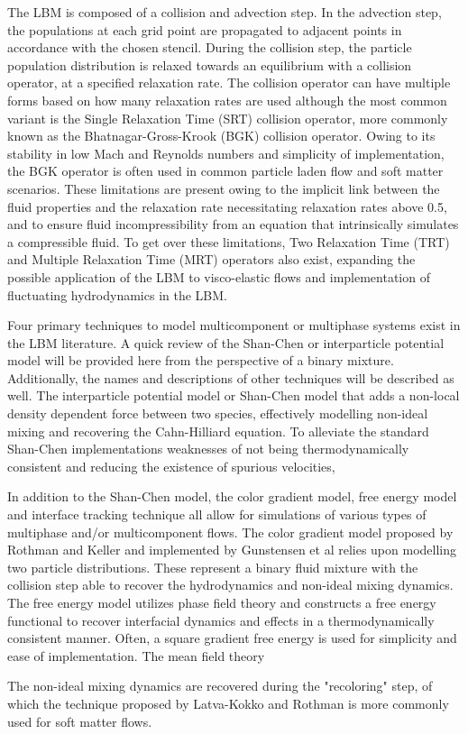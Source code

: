 The LBM is composed of a collision and advection step. In the advection step, the populations at each grid point are propagated to adjacent points in accordance 
with the chosen stencil. During the collision step, the particle population distribution is relaxed towards an equilibrium with a collision operator, at a 
specified relaxation rate. The collision operator can have multiple forms based on how many relaxation rates are used although the most common variant is the 
Single Relaxation Time (SRT) collision operator, more commonly known as the Bhatnagar-Gross-Krook (BGK) collision operator. Owing to its stability in low Mach 
and Reynolds numbers and simplicity of implementation, the BGK operator is often used in common particle laden flow and soft matter scenarios. 
\cite{bhatnagar_model_1954} These limitations are present owing to the implicit link between the fluid properties and the relaxation rate necessitating 
relaxation rates above 0.5, and to ensure fluid incompressibility from an equation that intrinsically simulates a compressible fluid. To get over these 
limitations, Two Relaxation Time (TRT) and Multiple Relaxation Time (MRT) operators also exist, expanding the possible application of the LBM to visco-elastic 
flows and implementation of fluctuating hydrodynamics in the LBM. \cite{liu_simulation_2023, adhikari_fluctuating_2005}

Four primary techniques to model multicomponent or multiphase systems exist in the LBM literature. A quick review of the Shan-Chen or 
interparticle potential model  will be provided here from the perspective of a binary mixture. Additionally, the names and descriptions of 
other techniques will be described as well. The interparticle potential model or Shan-Chen model that adds a non-local density dependent force 
between two species, effectively modelling non-ideal mixing and recovering the Cahn-Hilliard equation. To alleviate the standard Shan-Chen implementations 
weaknesses of not being thermodynamically consistent and reducing the existence of spurious velocities, 

In addition to the Shan-Chen model, the color gradient model, free energy model and interface tracking technique all 
allow for simulations of various types of multiphase and/or multicomponent flows. The color gradient model proposed by Rothman and Keller and 
implemented by Gunstensen et al relies upon modelling two particle distributions. These represent a binary fluid mixture with the collision step 
able to recover the hydrodynamics and non-ideal mixing dynamics. The free energy model utilizes phase field theory and constructs a free energy 
functional to recover interfacial dynamics and effects in a thermodynamically consistent manner. Often, a square gradient free energy is used for 
simplicity and ease of implementation. The mean field theory 

The non-ideal mixing dynamics are recovered during the "recoloring" step, of which the technique proposed by Latva-Kokko and Rothman is more commonly 
used for soft matter flows. \cite{liu_multiphase_2016}